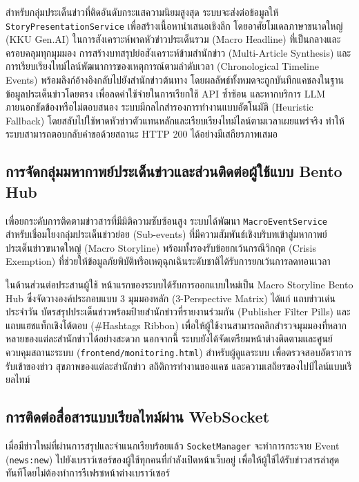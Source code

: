 สำหรับกลุ่มประเด็นข่าวที่ติดอันดับกระแสความนิยมสูงสุด ระบบจะส่งต่อข้อมูลให้ \texttt{StoryPresentationService} เพื่อสร้างเนื้อหานำเสนอเชิงลึก โดยอาศัยโมเดลภาษาขนาดใหญ่ (KKU Gen.AI) ในการสังเคราะห์พาดหัวข่าวประเด็นรวม (Macro Headline) ที่เป็นกลางและครอบคลุมทุกมุมมอง การสร้างบทสรุปย่อสังเคราะห์ข้ามสำนักข่าว (Multi-Article Synthesis) และการเรียบเรียงไทม์ไลน์พัฒนาการของเหตุการณ์ตามลำดับเวลา (Chronological Timeline Events) พร้อมลิงก์อ้างอิงกลับไปยังสำนักข่าวต้นทาง โดยผลลัพธ์ทั้งหมดจะถูกบันทึกแคชลงในฐานข้อมูลประเด็นข่าวโดยตรง เพื่อลดค่าใช้จ่ายในการเรียกใช้ API ซ้ำซ้อน และหากบริการ LLM ภายนอกขัดข้องหรือไม่ตอบสนอง ระบบมีกลไกสำรองการทำงานแบบอัตโนมัติ (Heuristic Fallback) โดยสลับไปใช้พาดหัวข่าวตัวแทนหลักและเรียบเรียงไทม์ไลน์ตามเวลาเผยแพร่จริง ทำให้ระบบสามารถตอบกลับคำขอด้วยสถานะ HTTP 200 ได้อย่างมีเสถียรภาพเสมอ

\subsection{การจัดกลุ่มมหากาพย์ประเด็นข่าวและส่วนติดต่อผู้ใช้แบบ Bento Hub}

เพื่อยกระดับการติดตามข่าวสารที่มีมิติความซับซ้อนสูง ระบบได้พัฒนา \texttt{MacroEventService} สำหรับเชื่อมโยงกลุ่มประเด็นข่าวย่อย (Sub-events) ที่มีความสัมพันธ์เชิงบริบทเข้าสู่มหากาพย์ประเด็นข่าวขนาดใหญ่ (Macro Storyline) พร้อมทั้งรองรับข้อยกเว้นกรณีวิกฤต (Crisis Exemption) ที่ช่วยให้ข้อมูลภัยพิบัติหรือเหตุฉุกเฉินระดับชาติได้รับการยกเว้นการลดทอนเวลา

ในด้านส่วนต่อประสานผู้ใช้ หน้าแรกของระบบได้รับการออกแบบใหม่เป็น Macro Storyline Bento Hub ซึ่งจัดวางองค์ประกอบแบบ 3 มุมมองหลัก (3-Perspective Matrix) ได้แก่ แถบข่าวเด่นประจำวัน บัตรสรุปประเด็นข่าวพร้อมป้ายสำนักข่าวที่รายงานร่วมกัน (Publisher Filter Pills) และแถบแฮชแท็กเชิงโต้ตอบ (\#Hashtags Ribbon) เพื่อให้ผู้ใช้งานสามารถคลิกสำรวจมุมมองที่หลากหลายของแต่ละสำนักข่าวได้อย่างสะดวก นอกจากนี้ ระบบยังได้จัดเตรียมหน้าต่างติดตามและศูนย์ควบคุมสถานะระบบ (\texttt{frontend/monitoring.html}) สำหรับผู้ดูแลระบบ เพื่อตรวจสอบอัตราการรับเข้าของข่าว สุขภาพของแต่ละสำนักข่าว สถิติการทำงานของแคช และความเสถียรของไปป์ไลน์แบบเรียลไทม์

\subsection{การติดต่อสื่อสารแบบเรียลไทม์ผ่าน WebSocket}

เมื่อมีข่าวใหม่ที่ผ่านการสรุปและจำแนกเรียบร้อยแล้ว \texttt{SocketManager} จะทำการกระจาย Event (\texttt{news:new}) ไปยังเบราว์เซอร์ของผู้ใช้ทุกคนที่กำลังเปิดหน้าเว็บอยู่ เพื่อให้ผู้ใช้ได้รับข่าวสารล่าสุดทันทีโดยไม่ต้องทำการรีเฟรชหน้าต่างเบราว์เซอร์

